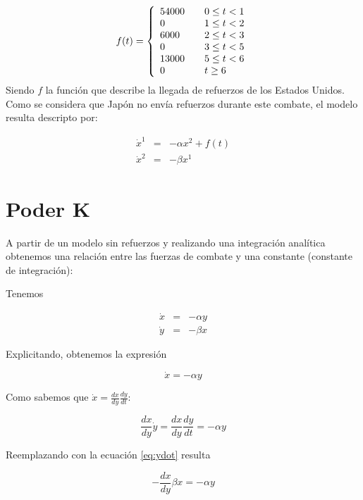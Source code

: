 \documentclass{sig-alternate}
\begin{document}
\begin{equation}
f(t) = \left\{ 
    \begin{array}{l l}
    54000 & \quad 0 \leq t < 1 \\
    0 & \quad 1 \leq t < 2\\
    6000 & \quad 2 \leq t < 3\\
    0 & \quad 3 \leq t < 5\\
    13000 & \quad 5 \leq t < 6\\
    0 & \quad t \geq 6\\
    \end{array} \right.
\end{equation}
Siendo $f$ la función que describe la llegada de refuerzos de los Estados Unidos. Como se considera que Japón no envía refuerzos durante este
combate, el modelo resulta descripto por:


\begin{eqnarray}
\dot{x}^1 &=& -\alpha x^2 + f(t)                              \\
\dot{x}^2 &=& -\beta x^1
\end{eqnarray}


\section{Poder K}

A partir de un modelo sin refuerzos y realizando una integración analítica obtenemos una relación entre las fuerzas de combate y una constante (constante de integración):

Tenemos

\begin{eqnarray}
\dot{x} & = & -\alpha y\label{eq:ydot}\\
\dot{y} & = & -\beta x\end{eqnarray}


Explicitando, obtenemos la expresión

\begin{equation}
\dot{x}=-\alpha y\end{equation}


Como sabemos que $\dot{x}=\frac{d x}{d y}\frac{d y}{d t}$:

\begin{equation}
\frac{d x}{d y}\dot{y}=\frac{d x}{d y}\frac{d y}{d t}=-\alpha y\end{equation}


Reemplazando con la ecuación \eqref{eq:ydot} resulta

\begin{equation}
-\frac{d x}{d y}\beta x=-\alpha y\end{equation}
\end{document}
